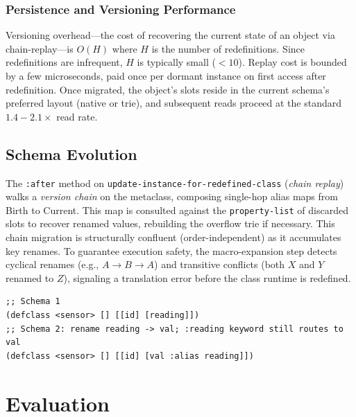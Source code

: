 \documentclass[sigconf,nonacm]{acmart}
\begin{document}
\subsubsection{Persistence and Versioning Performance}
Versioning overhead---the cost of recovering the current state of an object via chain-replay---is $O(H)$ where $H$ is the number of redefinitions. Since redefinitions are infrequent, $H$ is typically small ($< 10$). Replay cost is bounded by a few microseconds, paid once per dormant instance on first access after redefinition. Once migrated, the object's slots reside in the current schema's preferred layout (native or trie), and subsequent reads proceed at the standard $1.4-2.1\times$ read rate.

\subsection{Schema Evolution}
\label{sec:schema-evolution}
The \texttt{:after} method on \texttt{update-instance-for-redefined-class} (\textit{chain replay}) walks a \textit{version chain} on the metaclass, composing single-hop alias maps from Birth to Current. This map is consulted against the \texttt{property-list} of discarded slots to recover renamed values, rebuilding the overflow trie if necessary. This chain migration is structurally confluent (order-independent) as it accumulates key renames. To guarantee execution safety, the macro-expansion step detects cyclical renames (e.g., $A \to B \to A$) and transitive conflicts (both $X$ and $Y$ renamed to $Z$), signaling a translation error before the class runtime is redefined.

\begin{lstlisting}[caption={Lazy Schema Migration with Aliasing}, label={lst:lazy-migration}]
;; Schema 1
(defclass <sensor> [] [[id] [reading]])
;; Schema 2: rename reading -> val; :reading keyword still routes to val
(defclass <sensor> [] [[id] [val :alias reading]])
\end{lstlisting}

\section{Evaluation}
\label{sec:evaluation}
\end{document}
